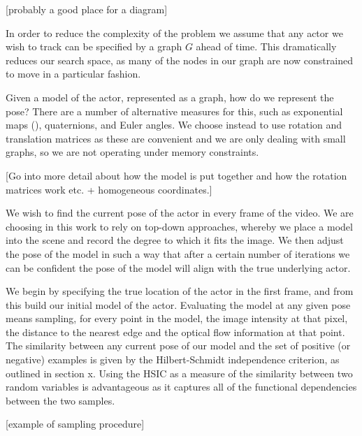 [probably a good place for a diagram]

In order to reduce the complexity of the problem we assume that any actor we wish to track can be specified by a graph $G$ ahead of time. This dramatically reduces our search space, as many of the nodes in our graph are now constrained to move in a particular fashion. 

Given a model of the actor, represented as a graph, how do we represent the pose? There are a number of alternative measures for this, such as exponential maps (), quaternions, and Euler angles. We choose instead to use rotation and translation matrices as these are convenient and we are only dealing with small graphs, so we are not operating under memory constraints. 

[Go into more detail about how the model is put together and how the rotation matrices work etc. + homogeneous coordinates.]

We wish to find the current pose of the actor in every frame of the video. We are choosing in this work to rely on top-down approaches, whereby we place a model into the scene and record the degree to which it fits the image. We then adjust the pose of the model in such a way that after a certain number of iterations we can be confident the pose of the model will align with the true underlying actor. 

We begin by specifying the true location of the actor in the first frame, and from this build our initial model of the actor. Evaluating the model at any given pose means sampling, for every point in the model, the image intensity at that pixel, the distance to the nearest edge and the optical flow information at that point. The similarity between any current pose of our model and the set of positive (or negative) examples is given by the Hilbert-Schmidt independence criterion, as outlined in section x. Using the HSIC as a measure of the similarity between two random variables is advantageous as it captures all of the functional dependencies between the two samples. 

[example of sampling procedure]












































